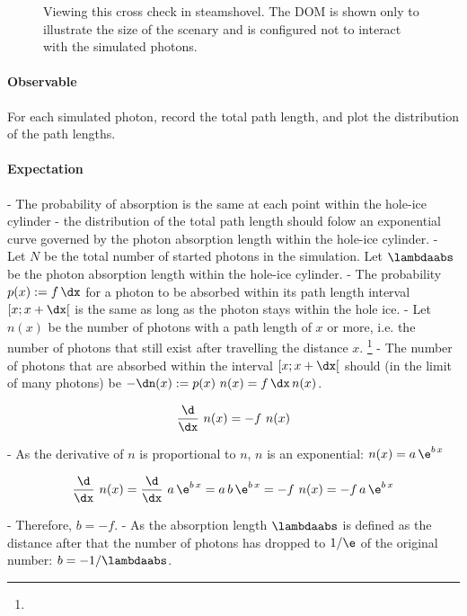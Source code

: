 \begin{figure}
  \caption{Viewing this cross check in steamshovel. The DOM is shown only to illustrate the size of the scenary and is configured not to interact with the simulated photons.}
\end{figure}

\paragraph{Observable} For each simulated photon, record the total path length, and plot the distribution of the path lengths.

\paragraph{Expectation}

- The probability of absorption is the same at each point within the hole-ice cylinder
- the distribution of the total path length should folow an exponential curve governed by the photon absorption length within the hole-ice cylinder.
- Let $N$ be the total number of started photons in the simulation. Let $\lambdaabs$ be the photon absorption length within the hole-ice cylinder.
- The probability $p(x):=f\,\dx$ for a photon to be absorbed within its path length interval $[x; x + \dx[$ is the same as long as the photon stays within the hole ice.
- Let $n(x)$ be the number of photons with a path length of $x$ or more, i.e. the number of photons that still exist after travelling the distance $x$. \footnote{}
- The number of photons that are absorbed within the interval $[x; x + \dx[$ should (in the limit of many photons) be $-\dn(x) := p(x)\ n(x) = f\,\dx\,n(x)$.

$$ \frac{\d}{\dx}\ n(x) = -f\ n(x) $$

- As the derivative of $n$ is proportional to $n$, $n$ is an exponential: $n(x) = a\,\e^{b\,x}$

$$ \frac{\d}{\dx}\ n(x)
  = \frac{\d}{\dx}\ a\,\e^{b\,x}
  = a\,b\,\e^{b\,x}
  = -f\ n(x)
  = -f\,a\,\e^{b\,x} $$

- Therefore, $b = -f$.
- As the absorption length $\lambdaabs$ is defined as the distance after that the number of photons has dropped to $1/\e$ of the original number: $b = -1/\lambdaabs$.


